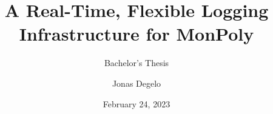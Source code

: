 \documentclass{beamer}
\title{A Real-Time, Flexible Logging Infrastructure for MonPoly}
\subtitle{Bachelor's Thesis}
\author{Jonas Degelo}
\institute{ETH Zürich}
\date{February 24, 2023}
\begin{document}
    \begin{frame}
        \titlepage
    \end{frame}


    
    
    
    
    
    
\end{document}
